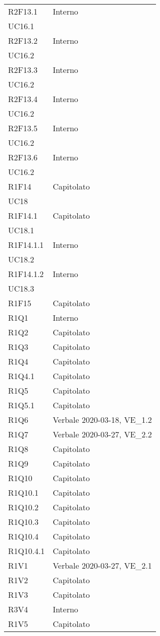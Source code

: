 \begin{longtable}{ 
		>{\centering}p{}
		>{\centering}p{}}
	R2F13.1	& Interno	\\ UC16.1 \tabularnewline
	R2F13.2	& Interno	\\ UC16.2 \tabularnewline
	R2F13.3	& Interno	\\ UC16.2 \tabularnewline
	R2F13.4	& Interno	\\ UC16.2 \tabularnewline
	R2F13.5	& Interno	\\ UC16.2 \tabularnewline
	R2F13.6	& Interno	\\ UC16.2 \tabularnewline
	R1F14	& Capitolato\\	UC18 \tabularnewline
	R1F14.1	& Capitolato\\	UC18.1 \tabularnewline
	R1F14.1.1 &	Interno	\\UC18.2 \tabularnewline
	R1F14.1.2 &	Interno	\\ UC18.3 \tabularnewline
	R1F15 &	Capitolato \tabularnewline 
	R1Q1 &	Interno	 \tabularnewline
	R1Q2 & 	Capitolato	 \tabularnewline
	R1Q3 & 	Capitolato \tabularnewline
	R1Q4 &	Capitolato \tabularnewline	
	R1Q4.1 &	Capitolato	\tabularnewline
	R1Q5 &	Capitolato	 \tabularnewline
	R1Q5.1 &	Capitolato	 \tabularnewline 
	R1Q6 &	Verbale 2020-03-18, VE\_1.2	\tabularnewline
	R1Q7 &	Verbale 2020-03-27, VE\_2.2	\tabularnewline
	R1Q8 & 	Capitolato	 \tabularnewline
	R1Q9 &	Capitolato	\tabularnewline
	R1Q10 &	Capitolato\tabularnewline
	R1Q10.1 & 	Capitolato\tabularnewline
	R1Q10.2	& Capitolato \tabularnewline
	R1Q10.3	& Capitolato \tabularnewline
	R1Q10.4	& Capitolato \tabularnewline
	R1Q10.4.1 &	Capitolato \tabularnewline
	R1V1 &	Verbale 2020-03-27, VE\_2.1 \tabularnewline
	R1V2 &	Capitolato \tabularnewline
	R1V3 &	Capitolato \tabularnewline
	R3V4 &	Interno \tabularnewline
	R1V5 &	Capitolato \tabularnewline

\end{longtable}	
